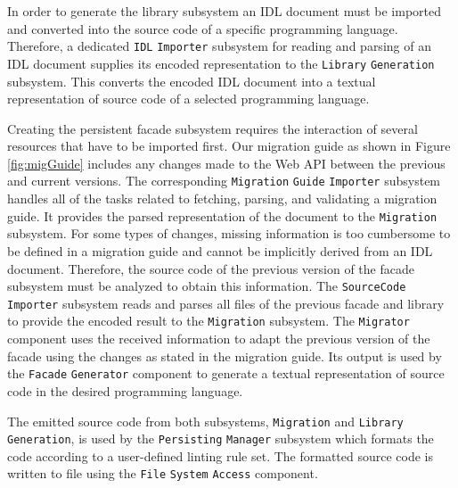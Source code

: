 In order to generate the library subsystem an IDL document must be imported and converted into the source code of a specific programming language. Therefore, a dedicated \texttt{IDL} \texttt{Importer} subsystem for reading and parsing of an IDL document supplies its encoded representation to the \texttt{Library} \texttt{Generation} subsystem. This converts the encoded IDL document into a textual representation of source code of a selected programming language. 

Creating the persistent facade subsystem requires the interaction of several resources that have to be imported first. Our migration guide as shown in Figure \ref{fig:migGuide} includes any changes made to the Web API between the previous and current versions. The corresponding \texttt{Migration} \texttt{Guide} \texttt{Importer} subsystem handles all of the tasks related to fetching, parsing, and validating a migration guide. It provides the parsed representation of the document to the \texttt{Migration} subsystem. For some types of changes, missing information is too cumbersome to be defined in a migration guide and cannot be implicitly derived from an IDL document. Therefore, the source code of the previous version of the facade subsystem must be analyzed to obtain this information. The \texttt{SourceCode} \texttt{Importer} subsystem reads and parses all files of the previous facade and library to provide the encoded result to the \texttt{Migration} subsystem. The \texttt{Migrator} component uses the received information to adapt the previous version of the facade using the changes as stated in the migration guide. Its output is used by the \texttt{Facade} \texttt{Generator} component to generate a textual representation of source code in the desired programming language. 

The emitted source code from both subsystems, \texttt{Migration} and \texttt{Library} \texttt{Gen\-er\-a\-tion}, is used by the \texttt{Persisting} \texttt{Manager} subsystem which formats the code according to a user-defined linting rule set. The formatted source code is written to file using the \texttt{File} \texttt{System} \texttt{Access} component.



